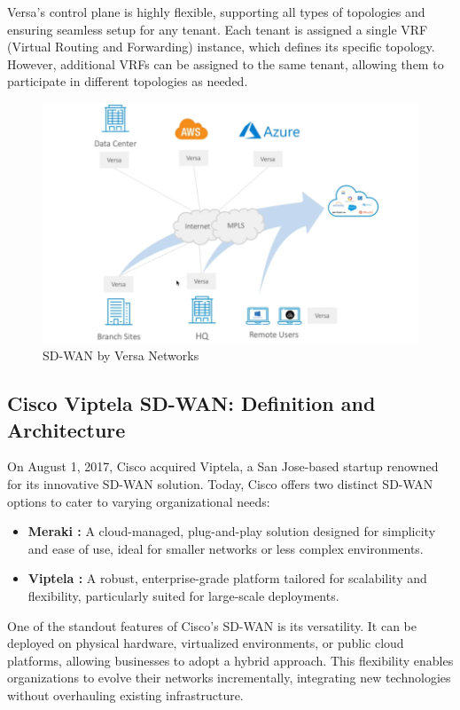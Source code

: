 \documentclass[12pt,english]{report}
\begin{document}
Versa’s control plane is highly flexible, supporting all types of topologies and ensuring seamless setup for any tenant. Each tenant is assigned a single VRF (Virtual Routing and Forwarding) instance, which defines its specific topology. However, additional VRFs can be assigned to the same tenant, allowing them to participate in different topologies as needed\cite{ref10}.

\begin{figure}[H]
    \centering
    \includegraphics[width= 1\textwidth]{chapter1/sdwan versa.png}
    \caption{SD-WAN by Versa Networks\cite{ref10}}
    \label{fig:  SD-WAN by Versa Networks}
\end{figure}

\subsection{Cisco Viptela SD-WAN: Definition and Architecture}
On August 1, 2017, Cisco acquired Viptela, a San Jose-based startup renowned for its innovative SD-WAN solution. Today, Cisco offers two distinct SD-WAN options to cater to varying organizational needs:
        \begin{itemize}
            \item \textbf{Meraki :} A cloud-managed, plug-and-play solution designed for simplicity and ease of use, ideal for smaller networks or less complex environments\cite{ref12}.
            \item \textbf{Viptela :} A robust, enterprise-grade platform tailored for scalability and flexibility, particularly suited for large-scale deployments\cite{ref11}.
        \end{itemize}

One of the standout features of Cisco’s SD-WAN is its versatility. It can be deployed on physical hardware, virtualized environments, or public cloud platforms, allowing businesses to adopt a hybrid approach. This flexibility enables organizations to evolve their networks incrementally, integrating new technologies without overhauling existing infrastructure.
\end{document}
